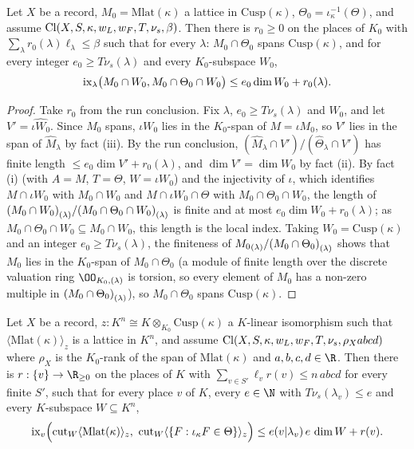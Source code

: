 \begin{lemma}\label{pf:onto2:l2}
Let $X$ be a record, $M_0=\mathrm{Mlat}(\kappa)$ a lattice in $\mathrm{Cusp}(\kappa)$, $\Theta_0=\iota_\kappa^{-1}(\Theta)$, and assume
$\mathrm{Cl}(X,S,\kappa,w_L,w_F,T,\nu_s,\beta)$. Then there is $r_0\ge0$ on the places of $K_0$ with $\sum_\lambda
r_0(\lambda)\ell_\lambda\le\beta$ such that for every $\lambda$: $M_0\cap\Theta_0$ spans $\mathrm{Cusp}(\kappa)$, and for every integer
$e_0\ge T\nu_s(\lambda)$ and every $K_0$-subspace $W_0$,
\[
\operatorname{ix}_\lambda\bigl(M_0\cap W_0,M_0\cap\Theta_0\cap W_0\bigr)\le e_0\dim W_0+r_0(\lambda).
\]
\end{lemma}

\begin{proof}
Take $r_0$ from the run conclusion. Fix $\lambda$, $e_0\ge T\nu_s(\lambda)$ and $W_0$, and let $V'=\widehat{\iota W_0}$. Since $M_0$
spans, $\iota W_0$ lies in the $K_0$-span of $M=\iota M_0$, so $V'$ lies in the span of $\widehat M_\lambda$ by fact (iii). By the run
conclusion, $(\widehat M_\lambda\cap V')/(\widehat\Theta_\lambda\cap V')$ has finite length $\le e_0\dim V'+r_0(\lambda)$, and $\dim
V'=\dim W_0$ by fact (ii). By fact (i) (with $A=M$, $T=\Theta$, $W=\iota W_0$) and the injectivity of $\iota$, which identifies
$M\cap\iota W_0$ with $M_0\cap W_0$ and $M\cap\iota W_0\cap\Theta$ with $M_0\cap\Theta_0\cap W_0$, the length of
${(M_0\cap W_0)}_{(\lambda)}/{(M_0\cap\Theta_0\cap W_0)}_{(\lambda)}$ is finite and at most $e_0\dim W_0+r_0(\lambda)$; as
$M_0\cap\Theta_0\cap W_0\subseteq M_0\cap W_0$, this length is the local index. Taking $W_0=\mathrm{Cusp}(\kappa)$ and an integer
$e_0\ge T\nu_s(\lambda)$, the finiteness of ${M_0}_{(\lambda)}/{(M_0\cap\Theta_0)}_{(\lambda)}$ shows that $M_0$ lies in the
$K_0$-span of $M_0\cap\Theta_0$ (a module of finite length over the discrete valuation ring $\OO_{K_0,(\lambda)}$ is torsion, so
every element of $M_0$ has a non-zero multiple in ${(M_0\cap\Theta_0)}_{(\lambda)}$), so $M_0\cap\Theta_0$ spans
$\mathrm{Cusp}(\kappa)$.
\end{proof}

\begin{lemma}\label{pf:onto2:rem}
Let $X$ be a record, $z:K^n\cong K\otimes_{K_0}\mathrm{Cusp}(\kappa)$ a $K$-linear isomorphism such that
$\langle\mathrm{Mlat}(\kappa)\rangle_z$ is a lattice in $K^n$, and assume $\mathrm{Cl}(X,S,\kappa,w_L,w_F,T,\nu_s,\rho_X abcd)$ where
$\rho_X$ is the $K_0$-rank of the span of $\mathrm{Mlat}(\kappa)$ and $a,b,c,d\in\R$. Then there is $r:\{v\}\to\R_{\ge0}$ on the
places of $K$ with $\sum_{v\in S'}\ell_vr(v)\le n\,abcd$ for every finite $S'$, such that for every place $v$ of $K$, every $e\in\N$
with $T\nu_s(\lambda_v)\le e$ and every $K$-subspace $W\subseteq K^n$,
\[
\ontoIIix_v\Bigl(\ontoIIcut_W\langle\mathrm{Mlat}(\kappa)\rangle_z,\ \ontoIIcut_W\langle\{F:\iota_\kappa F\in\Theta\}\rangle_z\Bigr)
\le e(v|\lambda_v)\,e\,\dim W+r(v).
\]
\end{lemma}

